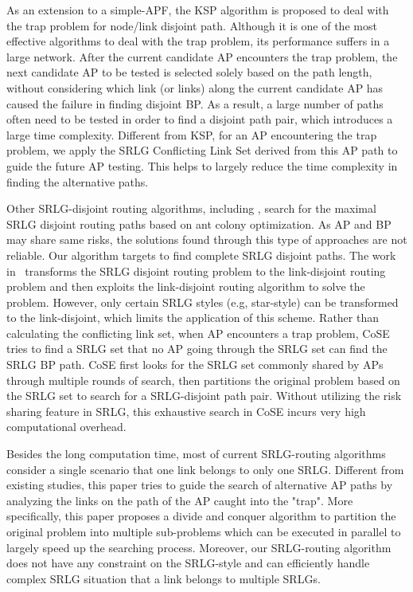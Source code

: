 As an extension to a simple-APF, the KSP algorithm\cite{eppstein1998finding}  is proposed to deal with the trap problem for node/link disjoint path. Although it is one of the most effective algorithms to deal with the trap problem,  its performance suffers in a large network. After the current candidate AP encounters the trap problem, the next candidate AP to be tested is selected solely based on the path length, without considering which link (or links) along the current candidate AP has caused the failure in finding disjoint BP. As a result, a large number of paths often need to be tested in order to find a disjoint path pair, which introduces a large time complexity. Different from KSP, for an  AP encountering the trap problem, we apply the SRLG Conflicting Link Set derived from this AP path to guide the future AP testing. This helps to largely reduce the time complexity in finding the alternative paths.

Other SRLG-disjoint routing algorithms, including \cite{xu2003trap,rostami2012msdp,rostami2007cose,datta2008graph,xu2003new,todimala2004imsh}, search for the maximal SRLG disjoint routing paths based on ant colony optimization\cite{rostami2012msdp}. As AP and BP may share same risks, the solutions found through this type of approaches are not reliable. Our algorithm targets to find complete SRLG disjoint paths. The work in~\cite{datta2008graph} transforms the SRLG disjoint routing problem to the link-disjoint routing problem and then exploits the link-disjoint routing algorithm to solve the problem. However, only certain SRLG styles (e.g, star-style) can be transformed to the link-disjoint, which limits the application of this scheme. Rather than calculating the conflicting link set, when AP encounters a trap problem, CoSE\cite{rostami2007cose} tries to find a SRLG set that no AP going through the SRLG set can find the SRLG BP path. CoSE first looks for the SRLG set commonly shared by APs through multiple rounds of search, then  partitions the original problem based on the SRLG set to search for a SRLG-disjoint path pair.  Without utilizing the risk sharing feature in SRLG, this exhaustive search in CoSE incurs very high computational overhead.



Besides the long computation time, most of current SRLG-routing algorithms consider a single scenario that one link belongs to only one SRLG. Different from existing studies\cite{rostami2007cose,datta2008graph}, this paper tries to guide the search of alternative AP paths by analyzing the links on the path of the AP caught into the "trap". More specifically, this paper proposes a divide and conquer algorithm to partition the original problem into multiple sub-problems which can be executed in parallel to largely speed up the searching process. Moreover, our SRLG-routing algorithm does not have any constraint on the SRLG-style and can efficiently handle complex SRLG situation that a link belongs to multiple SRLGs.
